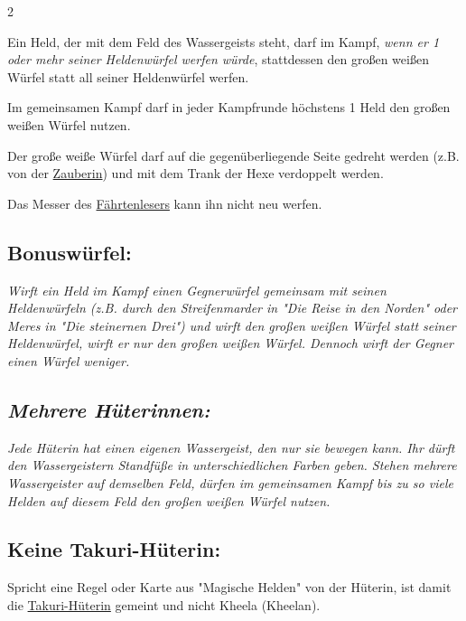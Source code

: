 \documentclass[10pt, a4paper, oneside]{book}
\newcommand{\fan}[1]{\textit{#1}}
\begin{document}
\begin{multicols*}{2}
\begin{nobgcolor}
Ein Held, der mit dem Feld des Wassergeists steht, darf im Kampf, \fan{wenn er 1 oder mehr seiner Heldenwürfel werfen würde}, stattdessen den großen weißen Würfel statt all seiner Heldenwürfel werfen.

Im gemeinsamen Kampf darf in jeder Kampfrunde höchstens 1 Held den großen weißen Würfel nutzen.
\supercite{5300}

Der große weiße Würfel darf auf die gegenüberliegende Seite gedreht werden (z.B. von der \hyperref[zauberin]{Zauberin}\supercite{5335}) und mit dem Trank der Hexe verdoppelt werden.
\supercite{5325}

Das Messer des \hyperref[faehrtenleser]{Fährtenlesers} kann ihn nicht neu werfen.
\supercite{5460}




\subsection{Bonuswürfel:}

\fan{Wirft ein Held im Kampf einen Gegnerwürfel gemeinsam mit seinen Heldenwürfeln (z.B. durch den Streifenmarder in "Die Reise in den Norden" oder Meres in "Die steinernen Drei") und wirft den großen weißen Würfel statt seiner Heldenwürfel, wirft er nur den großen weißen Würfel. Dennoch wirft der Gegner einen Würfel weniger.}







\subsection{\fan{Mehrere Hüterinnen:}}

\fan{Jede Hüterin hat einen eigenen Wassergeist, den nur sie bewegen kann. Ihr dürft den Wassergeistern Standfüße in unterschiedlichen Farben geben. Stehen mehrere Wassergeister auf demselben Feld, dürfen im gemeinsamen Kampf bis zu so viele Helden auf diesem Feld den großen weißen Würfel nutzen.}




\subsection{Keine Takuri-Hüterin:}

Spricht eine Regel oder Karte aus "Magische Helden" von der Hüterin, ist damit die \hyperref[takuri-hueterin]{Takuri-Hüterin} gemeint und nicht Kheela (Kheelan).


\end{nobgcolor}
\end{multicols*}
\end{document}
